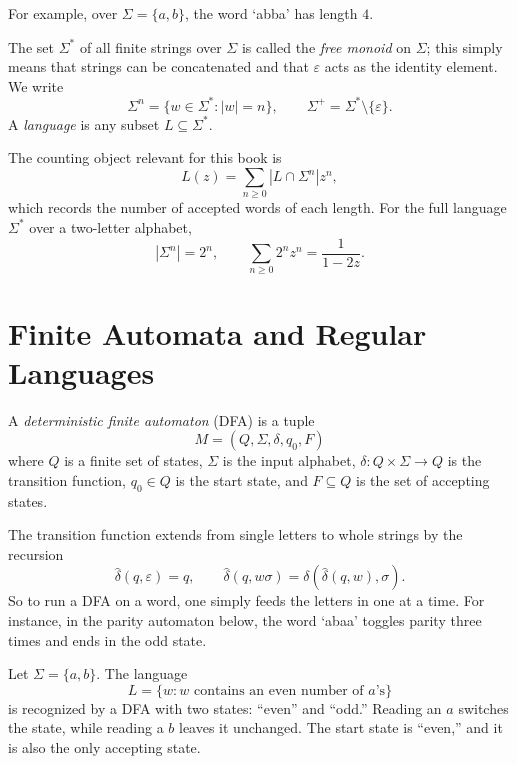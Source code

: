 For example, over $\Sigma=\{a,b\}$, the word `abba' has length $4$.

The set $\Sigma^*$ of all finite strings over $\Sigma$ is called the \emph{free monoid} on $\Sigma$; this simply means that strings can be concatenated and that $\varepsilon$ acts as the identity element. We write
\[
  \Sigma^n = \{w \in \Sigma^* : |w|=n\},
  \qquad
  \Sigma^+ = \Sigma^* \setminus \{\varepsilon\}.
\]
A \emph{language} is any subset $L \subseteq \Sigma^*$.

The counting object relevant for this book is
\[
  L(z) = \sum_{n \ge 0} |L \cap \Sigma^n| z^n,
\]
which records the number of accepted words of each length. For the full language $\Sigma^*$ over a two-letter alphabet,
\[
  |\Sigma^n| = 2^n,
  \qquad
  \sum_{n \ge 0} 2^n z^n = \frac{1}{1-2z}.
\]

\section{Finite Automata and Regular Languages}

\begin{definition}
A \emph{deterministic finite automaton} (DFA) is a tuple
\[
  M = (Q,\Sigma,\delta,q_0,F)
\]
where $Q$ is a finite set of states, $\Sigma$ is the input alphabet, $\delta : Q \times \Sigma \to Q$ is the transition function, $q_0 \in Q$ is the start state, and $F \subseteq Q$ is the set of accepting states.
\end{definition}

The transition function extends from single letters to whole strings by the recursion
\[
  \hat\delta(q,\varepsilon)=q,
  \qquad
  \hat\delta(q,w\sigma)=\delta(\hat\delta(q,w),\sigma).
\]
So to run a DFA on a word, one simply feeds the letters in one at a time. For instance, in the parity automaton below, the word `abaa' toggles parity three times and ends in the odd state.

\begin{example}
Let $\Sigma=\{a,b\}$. The language
\[
  L = \{w : w \text{ contains an even number of } a\text{'s}\}
\]
is recognized by a DFA with two states: ``even'' and ``odd.'' Reading an $a$ switches the state, while reading a $b$ leaves it unchanged. The start state is ``even,'' and it is also the only accepting state.

\begin{center}
\end{center}
\end{example}

